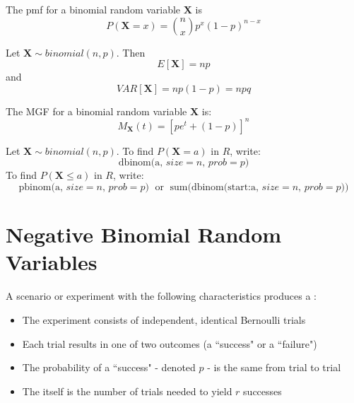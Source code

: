 \documentclass[12pt]{report}
\begin{document}
\begin{defn}{}{}
    The pmf for a binomial random variable $\mathbf{X}$ is \begin{equation*}
        P(\mathbf{X} = x) = \binom{n}{x}p^x(1-p)^{n-x} 
    \end{equation*}
\end{defn}

\begin{defn}{}{}
    Let $\mathbf{X}\sim binomial(n,p)$. Then \begin{equation*}
        E[\mathbf{X}] = np
    \end{equation*}
    and
    \begin{equation*}
        VAR[\mathbf{X}] = np(1-p) = npq
    \end{equation*}
\end{defn}


\begin{defn}{}{}
    The MGF for a binomial random variable $\mathbf{X}$ is: \begin{equation*}
        M_{\mathbf{X}}(t) = [pe^t+(1-p)]^n
    \end{equation*}
\end{defn}


\begin{defn}{}{}
    Let $\mathbf{X}\sim binomial(n,p)$. To find $P(\mathbf{X} = a)$ in $R$, write: \begin{equation*}
        \text{dbinom(a, $size = n$, $prob = p$)}
    \end{equation*}
    To find $P(\mathbf{X} \leq a)$ in $R$, write: \begin{equation*}
        \text{pbinom(a, $size = n$, $prob = p$)}\;\text{ or }\;\text{sum(dbinom(start:a, $size = n$, $prob = p$))}
    \end{equation*}
\end{defn}


\section{Negative Binomial Random Variables}

\begin{defn}{}{}
    A scenario or experiment with the following characteristics produces a : \begin{itemize}
        \item The experiment consists of independent, identical Bernoulli trials
        \item Each trial results in one of two outcomes (a ``success" or a ``failure")
        \item The probability of a ``success" - denoted $p$ - is the same from trial to trial
        \item The  itself is the number of trials needed to yield $r$ successes
    \end{itemize}
\end{defn}
\end{document}
